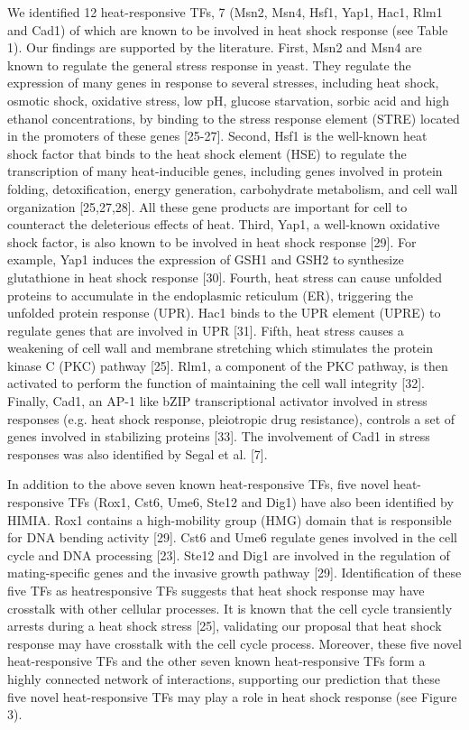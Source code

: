 \documentclass{pracamgr}
\begin{document}
We identified 12 heat-responsive TFs, 7 (Msn2, Msn4,
Hsf1, Yap1, Hac1, Rlm1 and Cad1) of which are known to
be involved in heat shock response (see Table 1). Our
findings are supported by the literature. First, Msn2 and
Msn4 are known to regulate the general stress response in
yeast. They regulate the expression of many genes in
response to several stresses, including heat shock, osmotic
shock, oxidative stress, low pH, glucose starvation, sorbic
acid and high ethanol concentrations, by binding to the
stress response element (STRE) located in the promoters
of these genes [25-27]. Second, Hsf1 is the well-known
heat shock factor that binds to the heat shock element
(HSE) to regulate the transcription of many heat-inducible
genes, including genes involved in protein folding,
detoxification, energy generation, carbohydrate metabolism,
and cell wall organization [25,27,28]. All these gene
products are important for cell to counteract the deleterious
effects of heat. Third, Yap1, a well-known oxidative
shock factor, is also known to be involved in heat shock
response [29]. For example, Yap1 induces the expression
of GSH1 and GSH2 to synthesize glutathione in heat
shock response [30]. Fourth, heat stress can cause
unfolded proteins to accumulate in the endoplasmic reticulum
(ER), triggering the unfolded protein response
(UPR). Hac1 binds to the UPR element (UPRE) to regulate
genes that are involved in UPR [31]. Fifth, heat stress
causes a weakening of cell wall and membrane stretching
which stimulates the protein kinase C (PKC) pathway
[25]. Rlm1, a component of the PKC pathway, is then activated
to perform the function of maintaining the cell wall
integrity [32]. Finally, Cad1, an AP-1 like bZIP transcriptional
activator involved in stress responses (e.g. heat
shock response, pleiotropic drug resistance), controls a set
of genes involved in stabilizing proteins [33]. The involvement
of Cad1 in stress responses was also identified by
Segal et al. [7].

In addition to the above seven known heat-responsive
TFs, five novel heat-responsive TFs (Rox1, Cst6, Ume6,
Ste12 and Dig1) have also been identified by HIMIA.
Rox1 contains a high-mobility group (HMG) domain that
is responsible for DNA bending activity [29]. Cst6 and
Ume6 regulate genes involved in the cell cycle and DNA
processing [23]. Ste12 and Dig1 are involved in the regulation
of mating-specific genes and the invasive growth
pathway [29]. Identification of these five TFs as heatresponsive
TFs suggests that heat shock response may
have crosstalk with other cellular processes. It is known
that the cell cycle transiently arrests during a heat shock
stress [25], validating our proposal that heat shock
response may have crosstalk with the cell cycle process.
Moreover, these five novel heat-responsive TFs and the
other seven known heat-responsive TFs form a highly connected
network of interactions, supporting our prediction
that these five novel heat-responsive TFs may play a role
in heat shock response (see Figure 3). \cite{NewTFs}
\end{document}
